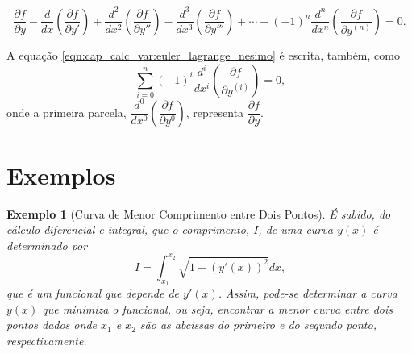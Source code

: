 \documentclass[
	12pt,				%
	openright,			%
    twoside,			%
	a4paper,			%
	chapter=TITLE,		%
	english,			%
	french,				%
	spanish,			%
	brazil				%
	]{abntex2}
\newtheorem{exemplo}{Exemplo}
\numberwithin{lema}{chapter}
\numberwithin{teorema}{chapter}
\numberwithin{definicao}{chapter}
\numberwithin{exemplo}{chapter}
\numberwithin{figure}{chapter}
\begin{document}
\begin{equation}
	\label{eqn:cap_calc_var:euler_lagrange_nesimo}
	\frac{\partial f}{\partial y}
	- \frac{d}{dx}\left ( \frac{\partial f}{\partial y'} \right )
	+ \frac{d^2}{dx^2}\left ( \frac{\partial f}{\partial y''} \right )
	- \frac{d^3}{dx^3}\left ( \frac{\partial f}{\partial y'''} \right )
	+ \cdots
	+ (-1)^n \frac{d^n}{dx^n}\left (\frac{\partial f}{\partial y^{(n)}} \right )
	= 0
	\text{.}
\end{equation}

A equação \eqref{eqn:cap_calc_var:euler_lagrange_nesimo} é escrita, também, como
$$
	\sum_{i=0}^n (-1)^i\frac{d^i}{dx^i}\left (
		\frac{\partial f}{\partial y^{(i)}}
	\right )
	= 0
	\text{,}
$$
onde a primeira parcela, $\dfrac{d^0}{dx^0} \left ( \dfrac{\partial f}{\partial y^0} \right )$, representa $\dfrac{\partial f}{\partial y}$.

\section{Exemplos}
\label{sec:calcvar_exemplos}

\begin{exemplo}[Curva de Menor Comprimento entre Dois Pontos]
	É sabido, do cálculo diferencial e integral, que o comprimento, $I$, de uma curva $y(x)$ é determinado por
	\begin{equation}
		\label{eqn:ex_reta_funcional}
		I=\int_{x_1}^{x_2}\sqrt{1+(y'(x))^2}dx
		\text{,}
	\end{equation}
	que é um funcional que depende de $y'(x)$. Assim, pode-se determinar a curva $y(x)$ que minimiza o funcional, ou seja, encontrar a menor curva entre dois pontos dados onde $x_1$ e $x_2$ são as abcissas do primeiro e do segundo ponto, respectivamente.
\end{exemplo}
\end{document}

